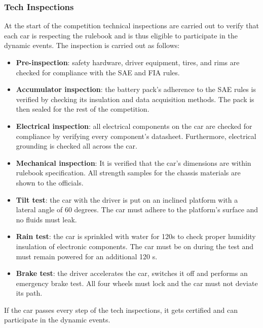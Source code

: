 \subsubsection{Tech Inspections}
At the start of the competition technical inspections are carried out to verify that each car is respecting the rulebook and is thus eligible to participate in the dynamic events.
The inspection is carried out as follows:
\begin{itemize}
    \item \textbf{Pre-inspection}: safety hardware, driver equipment, tires, and rims are checked for compliance with the SAE and FIA rules.
    \item \textbf{Accumulator inspection}: the battery pack's adherence to the SAE rules is verified by checking its insulation and data acquisition methods. The pack is then sealed for the rest of the competition.
    \item \textbf{Electrical inspection}: all electrical components on the car are checked for compliance by verifying every component's datasheet. Furthermore, electrical grounding is checked all across the car.
    \item \textbf{Mechanical inspection}: It is verified that the car's dimensions are within rulebook specification. All strength samples for the chassis materials are shown to the officials.
    \item \textbf{Tilt test}: the car with the driver is put on an inclined platform with a lateral angle of 60 degrees. The car must adhere to the platform's surface and no fluids must leak.
    \item \textbf{Rain test}: the car is sprinkled with water for 120s to check proper humidity insulation of electronic components. The car must be on during the test and must remain powered for an additional 120 s.
    \item \textbf{Brake test}: the driver accelerates the car, switches it off and performs an emergency brake test. All four wheels must lock and the car must not deviate its path.
\end{itemize}
If the car passes every step of the tech inspections, it gets certified and can participate in the dynamic events.

